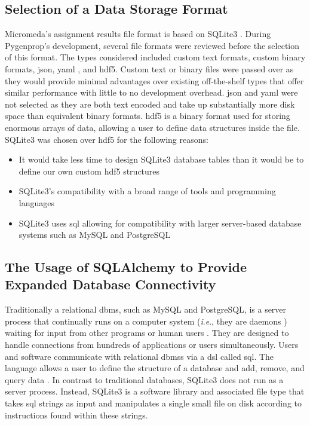 \subsection{Selection of a Data Storage Format}

Micromeda's assignment results file format is based on SQLite3 
\cite{owens2006definitive}. During Pygenprop's development, several file formats 
were reviewed before the selection of this format. The types considered included 
custom text formats, custom binary formats, \gls{json}, \gls{yaml} 
\cite{ben2005yaml}, and \gls{hdf5}. Custom text or binary files were passed over 
as they would provide minimal advantages over existing off-the-shelf types that 
offer similar performance with little to no development overhead. \gls{json} and 
\gls{yaml} were not selected as they are both text encoded and take up 
substantially more disk space than equivalent binary formats. \gls{hdf5} 
\cite{folk2011overview} is a binary format used for storing enormous arrays of 
data, allowing a user to define data structures inside the file. SQLite3 was 
chosen over \gls{hdf5} for the following reasons:

\begin{itemize}
\item It would take less time to design SQLite3 database tables than it would be 
to define our own custom \gls{hdf5} structures
\item SQLite3's compatibility with a broad range of tools and programming 
languages
\item SQLite3 uses \gls{sql} \cite{sql1987guide} allowing for compatibility with 
larger server-based database systems such as MySQL \cite{dubois1999mysql} and 
PostgreSQL \cite{momjian2001postgresql, owens2006definitive}
\end{itemize}

\subsection{The Usage of SQLAlchemy to Provide Expanded Database Connectivity} 
\label{SQLAlchemy}

Traditionally a relational \gls{dbms}, such as MySQL and PostgreSQL, is a server 
process that continually runs on a computer system (\textit{i}.\textit{e}., they 
are daemons \cite{martin2006computer}) waiting for input from other programs or 
human users \cite{dubois1999mysql, momjian2001postgresql}. They are designed to 
handle connections from hundreds of applications or users simultaneously. Users 
and software communicate with relational \gls{dbms}s via a \gls{dsl} called 
\gls{sql}. The language allows a user to define the structure of a database and 
add, remove, and query data \cite{sql1987guide}. In contrast to traditional 
databases, SQLite3 does not run as a server process. Instead, SQLite3 is a 
software library and associated file type that takes \gls{sql} strings as input 
and manipulates a single small file on disk \cite{owens2006definitive} according 
to instructions found within these strings.

